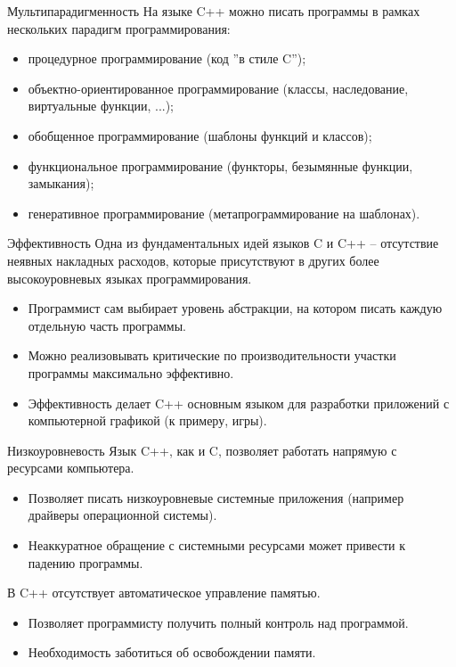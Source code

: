 \documentclass[
    9pt,
    hyperref={pdfencoding=unicode}
    ]{beamer}
\begin{document}
\begin{frame}{Мультипарадигменность}
    На языке C++ можно писать программы в рамках нескольких
    парадигм программирования:
    \begin{itemize}
        \item процедурное программирование
        (код ”в стиле C”);
        \item объектно-ориентированное программирование
        (классы, наследование, виртуальные функции, ...);
        \item обобщенное программирование
        (шаблоны функций и классов);
        \item функциональное программирование
        (функторы, безымянные функции, замыкания);
        \item генеративное программирование
        (метапрограммирование на шаблонах).
    \end{itemize}    
\end{frame}
\begin{frame}{Эффективность}
    Одна из фундаментальных идей языков C и C++ – отсутствие
    неявных накладных расходов, которые присутствуют в других
    более высокоуровневых языках программирования.
    \begin{itemize}
        \item Программист сам выбирает уровень абстракции, на котором
        писать каждую отдельную часть программы.
        \item Можно реализовывать критические по производительности
        участки программы максимально эффективно.
        \item Эффективность делает C++ основным языком для
        разработки приложений с компьютерной графикой (к
        примеру, игры).
    \end{itemize}
\end{frame}
\begin{frame}{Низкоуровневость}
    Язык C++, как и C, позволяет работать напрямую с ресурсами
    компьютера.
    \begin{itemize}
        \item Позволяет писать низкоуровневые системные приложения
        (например драйверы операционной системы).
        \item Неаккуратное обращение с системными ресурсами может
        привести к падению программы.
    \end{itemize}
    
    В C++ отсутствует автоматическое управление памятью.
    \begin{itemize}
        \item Позволяет программисту получить полный контроль над
        программой.
        \item Необходимость заботиться об освобождении памяти.
    \end{itemize}
\end{frame}
\end{document}

